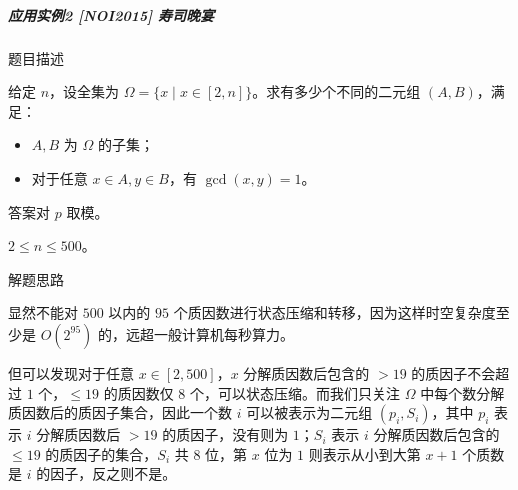 \begin{Shaded}
\begin{Highlighting}[]
\OperatorTok{[}\OperatorTok{][}\OperatorTok{+}\OperatorTok{(}\OperatorTok{)][}\OperatorTok{]+=}\OperatorTok{[}\OperatorTok{{-}}\OperatorTok{][}\OperatorTok{][}\OperatorTok{];}
                        \OperatorTok{\}}
                    \OperatorTok{\}}
                \OperatorTok{\}}
            \OperatorTok{\}}
        \OperatorTok{\}}
    \OperatorTok{\}}
     \OperatorTok{=}\OperatorTok{;}
    \OperatorTok{(}\OperatorTok{=}\OperatorTok{;}\OperatorTok{\textless{}(}\OperatorTok{\textless{}\textless{}}\OperatorTok{);}\OperatorTok{++)}\OperatorTok{+=}\OperatorTok{[}\OperatorTok{][}\OperatorTok{][}\OperatorTok{];}
\OperatorTok{\textless{}\textless{}}\OperatorTok{\textless{}\textless{}}\OperatorTok{;}
     \OperatorTok{;}
\OperatorTok{\}}
\end{Highlighting}
\end{Shaded}

\subparagraph{应用实例2 {[}NOI2015{]} 寿司晚宴}

题目描述

给定 \(n\)，设全集为
\(\Omega=\{x\mid x\in[2,n]\}\)。求有多少个不同的二元组 \((A,B)\)，满足：

\begin{itemize}
\tightlist
\item
  \(A,B\) 为 \(\Omega\) 的子集；
\item
  对于任意 \(x\in A,y\in B\)，有 \(\gcd(x,y)=1\)。
\end{itemize}

答案对 \(p\) 取模。

\(2\le n\le 500\)。

解题思路

显然不能对 \(500\) 以内的 \(95\)
个质因数进行状态压缩和转移，因为这样时空复杂度至少是 \(O(2^{95})\)
的，远超一般计算机每秒算力。

但可以发现对于任意 \(x\in[2,500]\)，\(x\) 分解质因数后包含的 \(\gt19\)
的质因子不会超过 \(1\) 个，\(\le19\) 的质因数仅 \(8\)
个，可以状态压缩。而我们只关注 \(\Omega\)
中每个数分解质因数后的质因子集合，因此一个数 \(i\) 可以被表示为二元组
\((p_i,S_i)\)，其中 \(p_i\) 表示 \(i\) 分解质因数后 \(\gt19\)
的质因子，没有则为 \(1\)；\(S_i\) 表示 \(i\) 分解质因数后包含的
\(\le19\) 的质因子的集合，\(S_i\) 共 \(8\) 位，第 \(x\) 位为 \(1\)
则表示从小到大第 \(x+1\) 个质数是 \(i\) 的因子，反之则不是。

